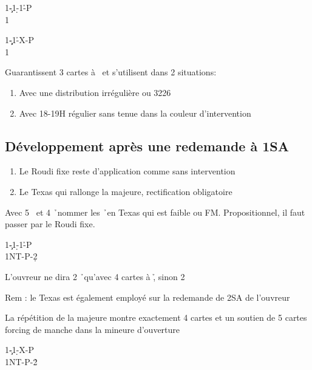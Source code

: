 \documentclass[a4paper]{article}
\begin{document}
\begin{bidtable}
1\c-1\d-1\h-P\\
1\s
\end{bidtable}

\begin{bidtable}
1\c\d-1\h-X-P\\
1\s
\end{bidtable}

Guarantissent 3 cartes à \s\ et s’utilisent dans 2 situations:

\begin{enumerate}
\item Avec une distribution irrégulière ou 3226

\item Avec 18-19H régulier sans tenue dans la couleur d’intervention

\end{enumerate}

\subsection{Développement après une redemande à 1SA}

\begin{enumerate}
\item Le Roudi fixe reste d’application comme sans intervention

\item Le Texas qui rallonge la majeure, rectification obligatoire

\end{enumerate}

Avec 5 \s\ et 4 \h\ nommer les \h\ en Texas qui est faible ou FM. 
Propositionnel, il faut passer par le Roudi fixe.

\begin{bidtable}
1\c-1\d-1\h-P\\
1NT-P-2\d
\end{bidtable}

L’ouvreur ne dira 2 \h\ qu’avec 4 cartes à \h , sinon 2 \s 

Rem : le Texas est également employé sur la redemande de 2SA de l’ouvreur

La répétition de la majeure montre exactement 4 cartes et un soutien 
de 5 cartes forcing de manche dans la mineure d’ouverture

\begin{bidtable}
1\c-1\d-X-P\\
1NT-P-2\h
\end{bidtable}
\end{document}
